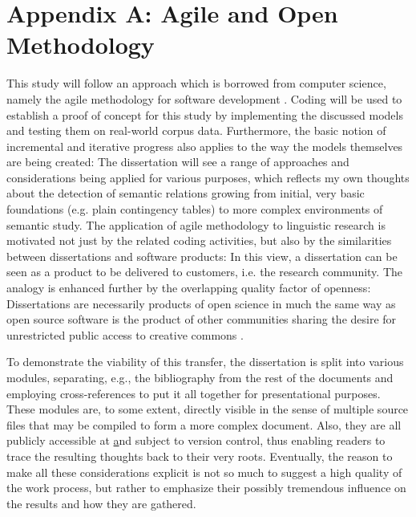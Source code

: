 \documentclass[oneside]{book}
\begin{document}
\section{Appendix A: Agile and Open Methodology}
\label{sec:appendixA}
This study will follow an approach which is borrowed from computer science, namely the agile methodology for software development \parencite[32]{fowlerAgileManifesto2001}. Coding will be used to establish a proof of concept for this study by implementing the discussed models and testing them on real-world corpus data. Furthermore, the basic notion of incremental and iterative progress also applies to the way the models themselves are being created: The dissertation will see a range of approaches and considerations being applied for various purposes, which reflects my own thoughts about the detection of semantic relations growing from initial, very basic foundations (e.g. plain contingency tables) to more complex environments of semantic study. The application of agile methodology to linguistic research is motivated not just by the related coding activities, but also by the similarities between dissertations and software products: In this view, a dissertation can be seen as a product to be delivered to customers, i.e. the research community. The analogy is enhanced further by the overlapping quality factor of openness: Dissertations are necessarily products of open science in much the same way as open source software is the product of other communities sharing the desire for unrestricted public access to creative commons \parencite[518]{garcia-penalvoOpenKnowledgeManagement2010}. 

To demonstrate the viability of this transfer, the dissertation is split into various modules, separating, e.g., the bibliography from the rest of the documents and employing cross-references to put it all together for presentational purposes. These modules are, to some extent, directly visible in the sense of multiple source files that may be compiled to form a more complex document. Also, they are all publicly accessible at \href{https://github.com/konstantinschulz/asrael} and subject to version control, thus enabling readers to trace the resulting thoughts back to their very roots. Eventually, the reason to make all these considerations explicit is not so much to suggest a high quality of the work process, but rather to emphasize their possibly tremendous influence on the results and how they are gathered.

\printbibliography[heading=bibintoc]
\end{document}
